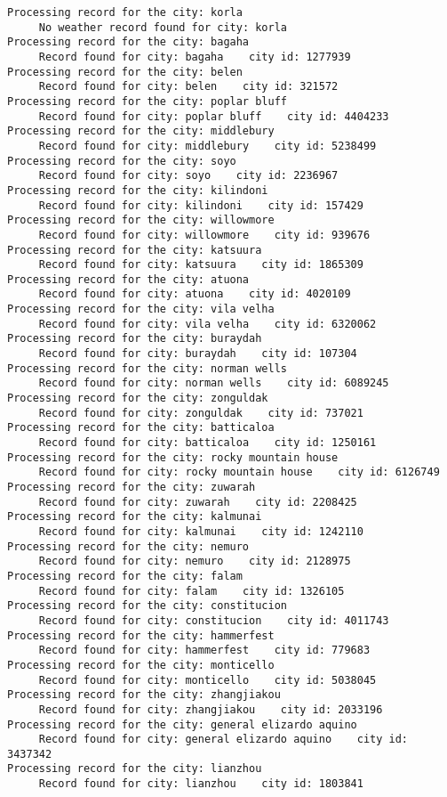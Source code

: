 \documentclass[11pt]{article}
\begin{document}
\begin{Verbatim}[commandchars=\\\{\}]
Processing record for the city: korla
     No weather record found for city: korla
Processing record for the city: bagaha
     Record found for city: bagaha    city id: 1277939
Processing record for the city: belen
     Record found for city: belen    city id: 321572
Processing record for the city: poplar bluff
     Record found for city: poplar bluff    city id: 4404233
Processing record for the city: middlebury
     Record found for city: middlebury    city id: 5238499
Processing record for the city: soyo
     Record found for city: soyo    city id: 2236967
Processing record for the city: kilindoni
     Record found for city: kilindoni    city id: 157429
Processing record for the city: willowmore
     Record found for city: willowmore    city id: 939676
Processing record for the city: katsuura
     Record found for city: katsuura    city id: 1865309
Processing record for the city: atuona
     Record found for city: atuona    city id: 4020109
Processing record for the city: vila velha
     Record found for city: vila velha    city id: 6320062
Processing record for the city: buraydah
     Record found for city: buraydah    city id: 107304
Processing record for the city: norman wells
     Record found for city: norman wells    city id: 6089245
Processing record for the city: zonguldak
     Record found for city: zonguldak    city id: 737021
Processing record for the city: batticaloa
     Record found for city: batticaloa    city id: 1250161
Processing record for the city: rocky mountain house
     Record found for city: rocky mountain house    city id: 6126749
Processing record for the city: zuwarah
     Record found for city: zuwarah    city id: 2208425
Processing record for the city: kalmunai
     Record found for city: kalmunai    city id: 1242110
Processing record for the city: nemuro
     Record found for city: nemuro    city id: 2128975
Processing record for the city: falam
     Record found for city: falam    city id: 1326105
Processing record for the city: constitucion
     Record found for city: constitucion    city id: 4011743
Processing record for the city: hammerfest
     Record found for city: hammerfest    city id: 779683
Processing record for the city: monticello
     Record found for city: monticello    city id: 5038045
Processing record for the city: zhangjiakou
     Record found for city: zhangjiakou    city id: 2033196
Processing record for the city: general elizardo aquino
     Record found for city: general elizardo aquino    city id: 3437342
Processing record for the city: lianzhou
     Record found for city: lianzhou    city id: 1803841

\end{Verbatim}
\end{document}
